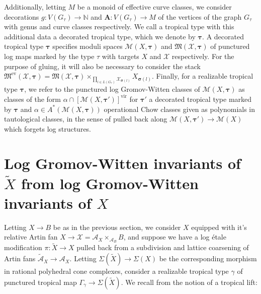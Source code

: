\documentclass[12pt, oneside]{amsart}   	%
\newcommand{\NN}{\mathbb{N}}
\newcommand{\vir}{\operatorname{vir}}
\newcommand{\ev}{\operatorname{ev}}
\numberwithin{equation}{section}
\numberwithin{thm}{section}
\numberwithin{figure}{section}
\begin{document}
Additionally, letting $M$ be a monoid of effective curve classes, we consider decorations $g: V(G_{\tau}) \rightarrow \NN$ and $\textbf{A}: V(G_{\tau}) \rightarrow M$ of the vertices of the graph $G_{\tau}$ with genus and curve classes respectively. We call a tropical type with this additional data a decorated tropical type, which we denote by $\pmb\tau$. A decorated tropical type $\pmb\tau$ specifies moduli spaces $\mathscr{M}(X,\pmb\tau)$ and $\mathfrak{M}(\mathcal{X},\pmb\tau)$ of punctured log maps marked by the type $\tau$ with targets $X$ and $\mathcal{X}$ respectively. For the purpose of gluing, it will also be necessary to consider the stack $\mathfrak{M}^{\ev}(\mathcal{X},\pmb\tau) = \mathfrak{M}(\mathcal{X},\pmb\tau) \times_{\prod_{l \in L(G_{\tau})}\mathcal{X}_{\pmb\sigma(l)}} X_{\pmb\sigma(l)}$. Finally, for a realizable tropical type $\pmb\tau$, we refer to the punctured log Gromov-Witten classes of $\mathscr{M}(X,\pmb\tau)$ as classes of the form $\alpha\cap[\mathscr{M}(X,\pmb\tau')]^{\vir}$ for $\pmb\tau'$ a decorated tropical type marked by $\pmb\tau$ and $\alpha \in A^*(\mathscr{M}(X,\pmb\tau))$ operational Chow classes given as polynomials in tautological classes, in the sense of \cite{tauttarget} pulled back along $\mathscr{M}(X,\pmb\tau') \rightarrow \mathscr{M}(X)$ which forgets log structures. 








\section{Log Gromov-Witten invariants of $\tilde{X}$ from log Gromov-Witten invariants of $X$}

Letting $X \rightarrow B$ be as in the previous section, we consider $X$ equipped with it's relative Artin fan $X \rightarrow\mathcal{X} = \mathcal{A}_X \times_{\mathcal{A}_B} B$, and suppose we have a log \'etale modification $\pi: \widetilde{X}\rightarrow X$ pulled back from a subdivision and lattice coarsening of Artin fans $\widetilde{\mathcal{A}}_X \rightarrow \mathcal{A}_X$. Letting $\Sigma(\widetilde{X})\rightarrow \Sigma(X)$ be the corresponding morphism in rational polyhedral cone complexes, consider a realizable tropical type $\gamma$ of punctured tropical map $\Gamma_\gamma \rightarrow \Sigma(\widetilde{X})$. We recall from \cite{pbirinv} the notion of a tropical lift:
\end{document}
